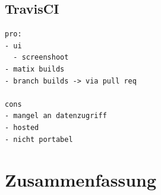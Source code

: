 \subsection{TravisCI}

\begin{verbatim}
pro:
- ui
  - screenshoot
- matix builds
- branch builds -> via pull req

cons
- mangel an datenzugriff
- hosted
- nicht portabel
\end{verbatim}



\section{Zusammenfassung}




